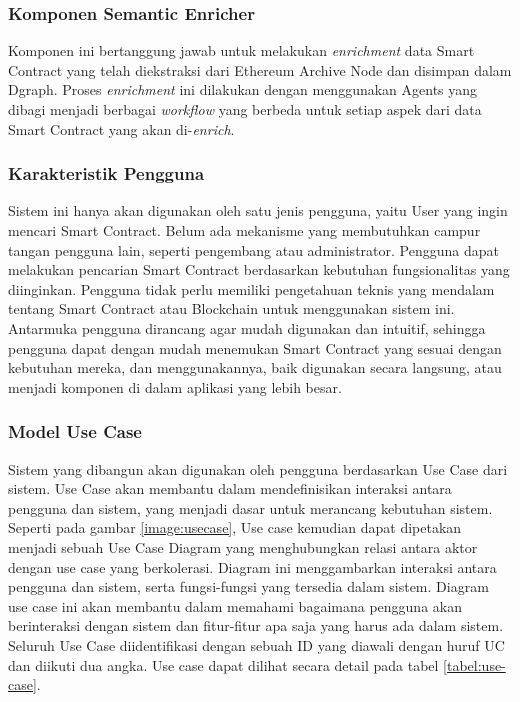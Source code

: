 \subsubsection{Komponen Semantic Enricher}

Komponen ini bertanggung jawab untuk melakukan \textit{enrichment} data Smart Contract yang telah diekstraksi dari Ethereum Archive Node dan disimpan dalam Dgraph. Proses \textit{enrichment} ini dilakukan dengan menggunakan Agents yang dibagi menjadi berbagai \textit{workflow} yang berbeda untuk setiap aspek dari data Smart Contract yang akan di-\textit{enrich}. 

\subsubsection{Karakteristik Pengguna}

Sistem ini hanya akan digunakan oleh satu jenis pengguna, yaitu User yang ingin mencari Smart Contract. Belum ada mekanisme yang membutuhkan campur tangan pengguna lain, seperti pengembang atau administrator. Pengguna dapat melakukan pencarian Smart Contract berdasarkan kebutuhan fungsionalitas yang diinginkan. Pengguna tidak perlu memiliki pengetahuan teknis yang mendalam tentang Smart Contract atau Blockchain untuk menggunakan sistem ini. Antarmuka pengguna dirancang agar mudah digunakan dan intuitif, sehingga pengguna dapat dengan mudah menemukan Smart Contract yang sesuai dengan kebutuhan mereka, dan menggunakannya, baik digunakan secara langsung, atau menjadi komponen di dalam aplikasi yang lebih besar.

\subsubsection{Model Use Case}

Sistem yang dibangun akan digunakan oleh pengguna berdasarkan Use Case dari sistem. Use Case akan membantu dalam mendefinisikan interaksi antara pengguna dan sistem, yang menjadi dasar untuk merancang kebutuhan sistem. Seperti pada gambar \ref{image:usecase}, Use case kemudian dapat dipetakan menjadi sebuah Use Case Diagram yang menghubungkan relasi antara aktor dengan use case yang berkolerasi. Diagram ini menggambarkan interaksi antara pengguna dan sistem, serta fungsi-fungsi yang tersedia dalam sistem. Diagram use case ini akan membantu dalam memahami bagaimana pengguna akan berinteraksi dengan sistem dan fitur-fitur apa saja yang harus ada dalam sistem. Seluruh Use Case diidentifikasi dengan sebuah ID yang diawali dengan huruf UC dan diikuti dua angka. Use case dapat dilihat secara detail pada tabel \ref{tabel:use-case}.

